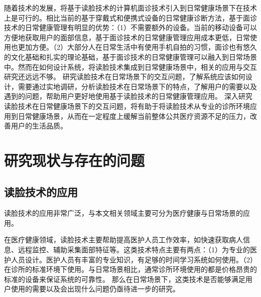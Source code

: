 

随着技术的发展，将基于读脸技术的计算机面诊技术引入到日常健康场景下在技术上是可行的。相比当前的基于穿戴式和便携式设备的日常健康诊断方法，基于面诊技术的日常健康管理有明显的优势：（1）不需要额外的设备。当前的移动设备可以方便地获取用户的面部信息，基于面诊技术的日常健康管理应用成本更低，日常使用也更加方便。（2）大部分人在日常生活中有使用手机自拍的习惯，面诊也有悠久的文化基础和扎实的理论基础，基于面诊技术的日常健康管理可以融入到日常场景中。然而在如何设计系统，将读脸技术集成到日常健康场景中，相关的应用与交互研究还远远不够。
研究读脸技术在日常场景下的交互问题，了解系统应该如何设计，需要通过实地调研，分析读脸技术在日常场景下的特点，了解用户的需要以及遇到的问题，帮助用户更好地使用基于读脸技术的日常健康管理应用。
深入研究读脸技术在日常健康场景下的交互问题，将有助于将读脸技术从专业的诊所环境应用到日常健康场景，从而在一定程度上缓解当前整体公共医疗资源不足的压力，改善用户的生活品质。



\section{研究现状与存在的问题}


\subsection{读脸技术的应用}
读脸技术的应用非常广泛，与本文相关领域主要可分为医疗健康与日常场景的应用。

在医疗健康领域，读脸技术主要帮助提高医护人员工作效率，如快速获取病人信息\cite{nwosu2016mobile}、远程监控\cite{Hossain2015Cloud}、辅助采集面部特征\cite{张红凯2015中医面诊信息采集与识别方法研究进展}等。这类技术特点主要有两点：（1）为专业的医护人员设计。医护人员有丰富的专业知识，有足够的时间学习系统如何使用。（2）在诊所的标准环境下使用。与日常场景相比，通常诊所环境使用的都是价格昂贵的标准的设备来保证系统的可靠性。
那么在日常场景下，这类技术是否能够满足用户使用的需要以及会出现什么问题仍亟待进一步的研究。

